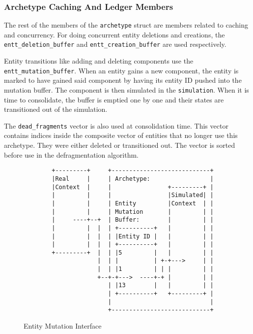 \subsubsection{Archetype Caching And Ledger Members}
The rest of the members of the \texttt{archetype} struct are members related to caching and concurrency. For doing concurrent entity deletions and creations, the \texttt{entt\_deletion\_buffer} and \texttt{entt\_creation\_buffer} are used respectively. 

Entity transitions like adding and deleting components use the \texttt{entt\_mutation\_buffer}. When an entity gains a new component, the entity is marked to have gained said component by having its entity ID pushed into the mutation buffer. The component is then simulated in the \texttt{simulation}. When it is time to consolidate, the buffer is emptied one by one and their states are transitioned out of the simulation. 

The \texttt{dead\_fragments} vector is also used at consolidation time. This vector contains indices inside the composite vector of entities that no longer use this archetype. They were either deleted or transitioned out. The vector is sorted before use in the defragmentation algorithm.

\begin{figure}[H]
\begin{verbatim}
        +---------+     +----------------------------+                             
        |Real     |     | Archetype:                 |                             
        |Context  |     |                +---------+ |                             
        |         |     |                |Simulated| |                             
        |         |     | Entity         |Context  | |                             
        |         |     | Mutation       |         | |                             
        |     ----+--+  | Buffer:        |         | |                             
        |         |  |  | +----------+   |         | |                             
        |         |  |  | |Entity ID |   |         | |                             
        |         |  |  | +----------+   |         | |                             
        +---------+  |  | |5         |   |         | |                             
                     |  | |          | +-+--->     | |                             
                     |  | |1         | | |         | |                             
                     +--+-+--->  ----+-+ |         | |                             
                        | |13        |   |         | |                             
                        | +----------+   +---------+ |                             
                        |                            |                             
                        +----------------------------+                                                      
\end{verbatim}
\caption{Entity Mutation Interface}
\label{code:component_retrieval}
\end{figure}

